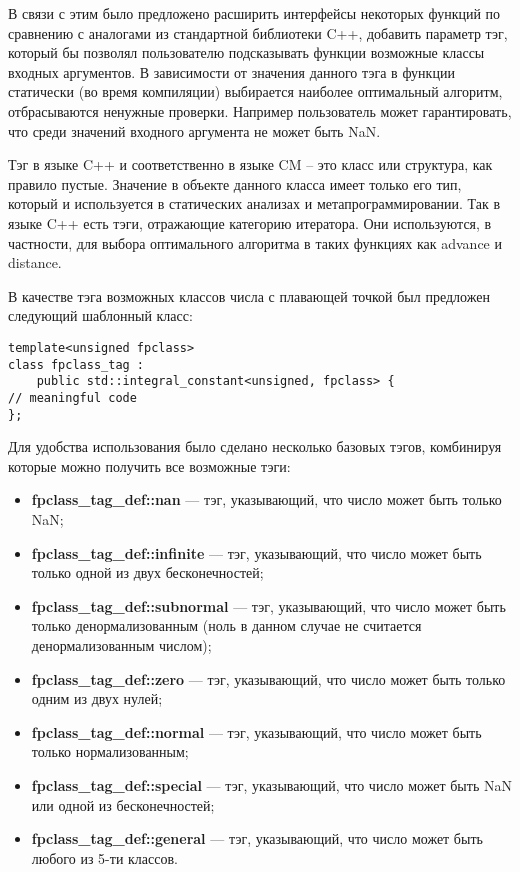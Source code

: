 В связи с этим было предложено расширить интерфейсы некоторых функций по сравнению с аналогами из стандартной библиотеки C++, добавить параметр тэг, который бы позволял пользователю подсказывать функции возможные классы входных аргументов.
В зависимости от значения данного тэга в функции статически (во время компиляции) выбирается наиболее оптимальный алгоритм, отбрасываются ненужные проверки.
Например пользователь может гарантировать, что среди значений входного аргумента не может быть NaN.

Тэг в языке C++ и соответственно в языке CM -- это класс или структура, как правило пустые.
Значение в объекте данного класса имеет только его тип, который и используется в статических анализах и метапрограммировании.
Так в языке C++ есть тэги, отражающие категорию итератора.
Они используются, в частности, для выбора оптимального алгоритма в таких функциях как advance и distance.

В качестве тэга возможных классов числа с плавающей точкой был предложен следующий шаблонный класс:

\begin{lstlisting}
template<unsigned fpclass>
class fpclass_tag :
    public std::integral_constant<unsigned, fpclass> {
// meaningful code
};
\end{lstlisting}

Для удобства использования было сделано несколько базовых тэгов, комбинируя которые можно получить все возможные тэги:

\begin{itemize}
    \item \textbf{fpclass\_tag\_def::nan} --- тэг, указывающий, что число может быть только NaN;
    \item \textbf{fpclass\_tag\_def::infinite} --- тэг, указывающий, что число может быть только одной из двух бесконечностей;
    \item \textbf{fpclass\_tag\_def::subnormal} --- тэг, указывающий, что число может быть только денормализованным (ноль в данном случае не считается денормализованным числом);
    \item \textbf{fpclass\_tag\_def::zero} --- тэг, указывающий, что число может быть только одним из двух нулей;
    \item \textbf{fpclass\_tag\_def::normal} --- тэг, указывающий, что число может быть только нормализованным;
    \item \textbf{fpclass\_tag\_def::special} --- тэг, указывающий, что число может быть NaN или одной из бесконечностей;
    \item \textbf{fpclass\_tag\_def::general} --- тэг, указывающий, что число может быть любого из 5-ти классов.
\end{itemize}

